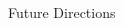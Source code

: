 \documentclass[mathserif]{beamer}
\begin{document}
\begin{frame}{Future Directions}
\begin{columns}
\begin{column}{0.4\textwidth}
{%
}
\end{column}
\end{columns}

\end{frame}
\end{document}
